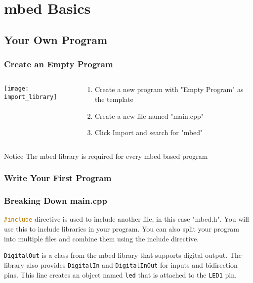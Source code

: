 \section{mbed Basics}
\subsection{Your Own Program}
\begin{frame}
	\frametitle{Create an Empty Program}
	\begin{columns}[T]
		\begin{column}{0.5\textwidth}
			\texttt{[image: import\_library]}
		\end{column}
		\begin{column}{0.5\textwidth}
			\begin{enumerate}
				\item Create a new program with "Empty Program" as the template
				\item Create a new file named "main.cpp"
				\item Click Import and search for "mbed"
			\end{enumerate}
		\end{column}
	\end{columns}
	\begin{block}{Notice}
		The mbed library is required for every mbed based program
	\end{block}
\end{frame}

\begin{frame}[fragile]
	\frametitle{Write Your First Program}
	
\end{frame}

\begin{frame}[fragile]
	\frametitle{Breaking Down main.cpp}
	
	\lstinline[language=C++]$#include$ directive is used to include another file, in this case "mbed.h".
	You will use this to include libraries in your program.
	You can also split your program into multiple files and combine them using the include directive.
	
	
	\lstinline[language=C++]$DigitalOut$ is a class from the mbed library that supports digital output.
	The library also provides \lstinline[language=C++]$DigitalIn$ and \lstinline[language=C++]$DigitalInOut$ for inputs and bidirection pins.
	This line creates an object named \lstinline[language=C++]$led$ that is attached to the \lstinline[language=C++]$LED1$ pin.
\end{frame}

